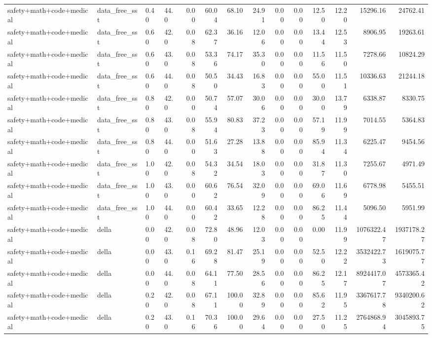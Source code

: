 \documentclass{article}
\begin{document}
\begin{table}[H]
{\begin{tabular}{llllrrrrrrrrrr}
safety+math+code+medical & data\_free\_sst & 0.40 & 44.0 & 0.00 & 60.04 & 68.10 & 24.91 & 0.00 & 0.00 & 12.50 & 12.20 & 15296.16 & 24762.41 \\
safety+math+code+medical & data\_free\_sst & 0.60 & 42.0 & 0.08 & 62.37 & 36.16 & 12.06 & 0.00 & 0.00 & 13.44 & 12.53 & 8906.95 & 19263.61 \\
safety+math+code+medical & data\_free\_sst & 0.60 & 43.0 & 0.08 & 53.36 & 74.17 & 35.30 & 0.00 & 0.00 & 11.56 & 11.50 & 7278.66 & 10824.29 \\
safety+math+code+medical & data\_free\_sst & 0.60 & 44.0 & 0.08 & 50.50 & 34.43 & 16.83 & 0.00 & 0.00 & 55.00 & 11.51 & 10336.63 & 21244.18 \\
safety+math+code+medical & data\_free\_sst & 0.80 & 42.0 & 0.00 & 50.74 & 57.07 & 30.06 & 0.00 & 0.00 & 30.00 & 13.79 & 6338.87 & 8330.75 \\
safety+math+code+medical & data\_free\_sst & 0.80 & 43.0 & 0.08 & 55.94 & 80.83 & 37.23 & 0.00 & 0.00 & 57.19 & 11.99 & 7014.55 & 5364.83 \\
safety+math+code+medical & data\_free\_sst & 0.80 & 44.0 & 0.00 & 51.63 & 27.28 & 13.88 & 0.00 & 0.00 & 85.94 & 11.34 & 6225.47 & 9454.56 \\
safety+math+code+medical & data\_free\_sst & 1.00 & 42.0 & 0.08 & 54.32 & 34.54 & 18.03 & 0.00 & 0.00 & 31.87 & 11.30 & 7255.67 & 4971.49 \\
safety+math+code+medical & data\_free\_sst & 1.00 & 43.0 & 0.00 & 60.62 & 76.54 & 32.09 & 0.00 & 0.00 & 69.06 & 11.69 & 6778.98 & 5455.51 \\
safety+math+code+medical & data\_free\_sst & 1.00 & 44.0 & 0.00 & 60.42 & 33.65 & 12.28 & 0.00 & 0.00 & 86.25 & 11.44 & 5096.50 & 5951.99 \\
safety+math+code+medical & della & 0.00 & 42.0 & 0.08 & 72.80 & 48.96 & 12.03 & 0.00 & 0.00 & 0.00 & 11.99 & 1076322.47 & 1937178.27 \\
safety+math+code+medical & della & 0.00 & 43.0 & 0.16 & 69.28 & 81.47 & 25.19 & 0.00 & 0.00 & 52.50 & 12.22 & 3532422.73 & 1619075.77 \\
safety+math+code+medical & della & 0.00 & 44.0 & 0.08 & 64.11 & 77.50 & 28.56 & 0.00 & 0.00 & 86.25 & 12.17 & 8924417.07 & 4573365.42 \\
safety+math+code+medical & della & 0.20 & 42.0 & 0.08 & 67.11 & 100.00 & 32.89 & 0.00 & 0.00 & 85.62 & 11.95 & 3367617.78 & 9340200.62 \\
safety+math+code+medical & della & 0.20 & 43.0 & 0.16 & 70.36 & 100.00 & 29.64 & 0.00 & 0.00 & 27.50 & 11.25 & 2764868.94 & 3045893.75 \\

\end{tabular}}
\end{table}
\end{document}
